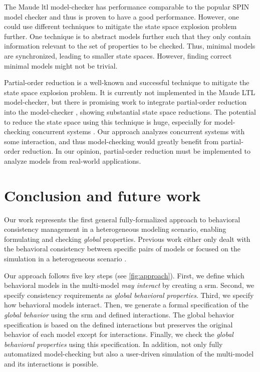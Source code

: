 \documentclass{jot}
\begin{document}
The Maude \gls*{ltl} model-checker has performance comparable to the popular SPIN model checker \cite{ekerMaudeLTLModel2004} and thus is proven to have a good performance.
However, one could use different techniques to mitigate the state space explosion problem further.
One technique is to abstract models further such that they only contain information relevant to the set of properties to be checked.
Thus, minimal models are synchronized, leading to smaller state spaces.
However, finding correct minimal models might not be trivial.

Partial-order reduction is a well-known and successful technique to mitigate the state space explosion problem.
It is currently not implemented in the Maude LTL model-checker, but there is promising work to integrate partial-order reduction into the model-checker \cite{farzanPartialOrderReduction2007}, showing substantial state space reductions.
The potential to reduce the state space using this technique is huge, especially for model-checking concurrent systems \cite{clarkeHandbookModelChecking2018}.
Our approach analyzes concurrent systems with some interaction, and thus model-checking would greatly benefit from partial-order reduction.
In our opinion, partial-order reduction must be implemented to analyze models from real-world applications.


\section{Conclusion and future work} \label{sec:conclusion_and_future_work}
Our work represents the first general fully-formalized approach to behavioral consistency management in a heterogeneous modeling scenario, enabling formulating and checking \emph{global} properties.
Previous work either only dealt with the behavioral consistency between specific pairs of models \cite{yaoConsistencyCheckingUML2006, kusterExplicitBehavioralConsistency2003} or focused on the simulation in a heterogeneous scenario \cite{varalarsenBehavioralCoordinationOperator2015, ekerTamingHeterogeneityPtolemy2003, leeDisciplinedHeterogeneousModeling2010}.

Our approach follows five key steps (see \cref{fig:approach}).
First, we define which behavioral models in the multi-model \emph{may interact} by creating a \gls*{srm}.
Second, we specify consistency requirements as \emph{global behavioral properties}.
Third, we specify how behavioral models interact.
Then, we generate a formal specification of the \emph{global behavior} using the \gls*{srm} and defined interactions.
The global behavior specification is based on the defined interactions but preserves the original behavior of each model except for interactions.
Finally, we check the \emph{global behavioral properties} using this specification.
In addition, not only fully automatized model-checking but also a user-driven simulation of the multi-model and its interactions is possible.
\end{document}
